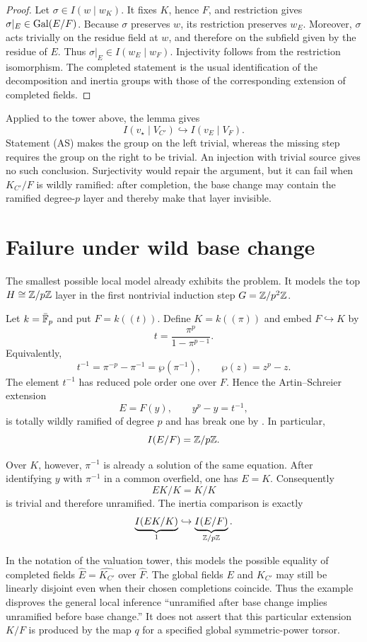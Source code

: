 \begin{proof}
Let $\sigma\in I(w\mid w_K)$. It fixes $K$, hence $F$, and restriction gives
$\sigma|_E\in\operatorname{Gal}(E/F)$. Because $\sigma$ preserves $w$, its restriction
preserves $w_E$. Moreover, $\sigma$ acts trivially on the residue field at
$w$, and therefore on the subfield given by the residue of $E$. Thus
$\sigma|_E\in I(w_E\mid w_F)$. Injectivity follows from the restriction
isomorphism. The completed statement is the usual identification of the
decomposition and inertia groups with those of the corresponding extension
of completed fields.
\end{proof}

Applied to the tower above, the lemma gives
\[
I(v_\star\mid V_{C'})\hookrightarrow I(v_E\mid V_F).
\]
Statement (AS) makes the group on the left trivial, whereas the missing step
requires the group on the right to be trivial. An injection with trivial
source gives no such conclusion. Surjectivity would repair the argument, but
it can fail when $K_{C'}/F$ is wildly ramified: after completion, the base
change may contain the ramified degree-$p$ layer and thereby make that layer
invisible.


\section{Failure under wild base change}
\label{sec:as_induction_wild_base_change}

The smallest possible local model already exhibits the problem. It models
the top $H\cong\mathbb{Z}/p\mathbb{Z}$ layer in the first nontrivial induction step
$G=\mathbb{Z}/p^2\mathbb{Z}$.

\begin{example}
\label{ex:p2-counterexample}
\label{ex:absorption-explicit}
Let $k=\bar{\mathbb{F}}_p$ and put $F=k((t))$. Define $K=k((\pi))$ and embed
$F\hookrightarrow K$ by
\[
t=\frac{\pi^p}{1-\pi^{p-1}}.
\]
Equivalently,
\[
t^{-1}=\pi^{-p}-\pi^{-1}
       =\wp(\pi^{-1}),
\qquad \wp(z)=z^p-z.
\]
The element $t^{-1}$ has reduced pole order one over $F$. Hence the
Artin--Schreier extension
\[
E=F(y),\qquad y^p-y=t^{-1},
\]
is totally wildly ramified of degree $p$ and has break one by
. In particular,
\[
I(E/F)=\mathbb{Z}/p\mathbb{Z}.
\]

Over $K$, however, $\pi^{-1}$ is already a solution of the same equation.
After identifying $y$ with $\pi^{-1}$ in a common overfield, one has $E=K$.
Consequently
\[
EK/K=K/K
\]
is trivial and therefore unramified. The inertia comparison is exactly
\[
\underbrace{I(EK/K)}_{1}
\hookrightarrow
\underbrace{I(E/F)}_{\mathbb{Z}/p\mathbb{Z}}.
\]

In the notation of the valuation tower, this models the possible equality of
completed fields $\widehat E=\widehat{K_{C'}}$ over $\widehat F$. The global
fields $E$ and $K_{C'}$ may still be linearly disjoint even when their chosen
completions coincide. Thus the example disproves the general local inference
``unramified after base change implies unramified before base change.'' It
does not assert that this particular extension $K/F$ is produced by the map
$q$ for a specified global symmetric-power torsor.
\end{example}

